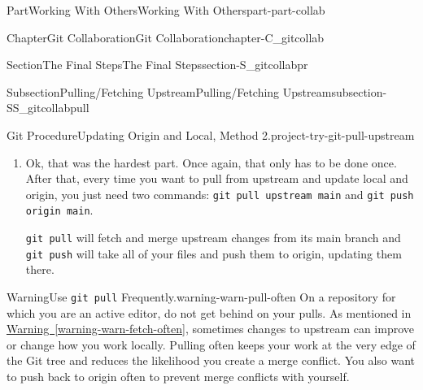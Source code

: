 \documentclass[oneside,10pt,]{book}
\newcommand{\xreffont}{\relax}
\newcommand{\mono}[1]{\texttt{#1}}
\newcommand{\initialism}[1]{\textsc{\MakeLowercase{#1}}}
\begin{document}
\begin{partptx}{Part}{Working With Others}{}{Working With Others}{}{}{part-part-collab}
\begin{chapterptx}{Chapter}{Git Collaboration}{}{Git Collaboration}{}{}{chapter-C_gitcollab}
\begin{sectionptx}{Section}{The Final Steps}{}{The Final Steps}{}{}{section-S_gitcollabpr}
\begin{subsectionptx}{Subsection}{Pulling\slash{}Fetching Upstream}{}{Pulling\slash{}Fetching Upstream}{}{}{subsection-SS_gitcollabpull}
\begin{project}{Git Procedure}{Updating Origin and Local, Method 2.}{project-try-git-pull-upstream}
\begin{enumerate}[font=\bfseries,label=(\alph*),ref=\alph*]
\begin{console}{0}{1}{0}
Please make sure you have the correct access rights
and the repository exists.
\end{console}
This is troublesome! Clearly upstream exists; how else would we have forked it? To fix this, you need to manually set the remote connection. Again, this only has to be done once per forked\slash{}cloned repo.%
\begin{enumerate}[font=\bfseries,label=(\roman*),ref=\theenumi.\roman*]%
\item{}Navigate to the authoritative repo's homepage and copy its \initialism{HTTPS} clone link, just as if you were going to clone the repo.%
\item{}Head back to your terminal and use \mono{git remote add upstream <https-link>}. There will be no output.%
\item{}Verify that it worked with \mono{git remote -v}. This will print out the HTTPS links for origin and upstream. Make sure your username is on the origin remotes and the official repo\slash{}username is on the upstream remotes.%
\end{enumerate}%
\item{}Ok, that was the hardest part. Once again, that only has to be done once. After that, every time you want to pull from upstream and update local and origin, you just need two commands: \mono{git pull upstream main} and \mono{git push origin main}.%
\par
\mono{git pull} will fetch and merge upstream changes from its main branch and \mono{git push} will take all of your files and push them to origin, updating them there.%
\end{enumerate}%
\end{project}%
\begin{warning}{Warning}{Use \mono{git pull} Frequently.}{warning-warn-pull-often}%
On a repository for which you are an active editor, do not get behind on your pulls. As mentioned in \hyperref[warning-warn-fetch-often]{Warning~{\xreffont\ref{warning-warn-fetch-often}}}, sometimes changes to upstream can improve or change how you work locally. Pulling often keeps your work at the very edge of the Git tree and reduces the likelihood you create a merge conflict. You also want to push back to origin often to prevent merge conflicts with yourself.%
\end{warning}
\end{subsectionptx}
\end{sectionptx}
%
%
\typeout{************************************************}

\end{chapterptx}
\end{partptx}
\end{document}
